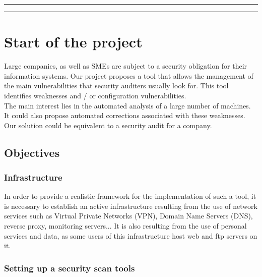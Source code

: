 \pagebreak

\noindent\rule{\textwidth}{.1pt}%
\tableofcontents
\noindent\rule{\textwidth}{.1pt}%

\pagebreak

\listoffigures

\pagebreak

\section{Start of the project}


Large companies, as well as SMEs are subject to a security obligation
for their information systems. Our project proposes a tool that allows the
management of the main vulnerabilities that security auditers usually look for.
This tool identifies weaknesses and / or configuration vulnerabilities.
\\
The main interest lies in the automated analysis of a large number of machines.
It could also propose automated corrections associated with these weaknesses.
Our solution could be equivalent to a security audit for a company.

\vspace{1cm}
\subsection{Objectives}
\vspace{0.5cm}

\subsubsection{Infrastructure}

In order to provide a realistic framework for the implementation of such a tool, it is necessary to establish an active infrastructure resulting from the use of network services such as Virtual Private Networks (VPN), Domain Name Servers (DNS), reverse proxy, monitoring servers... It is also resulting from the use of personal services and data, as some users of this infrastructure host web and ftp servers on it.

\vspace{0.5cm}
\subsubsection{Setting up a security scan tools}

